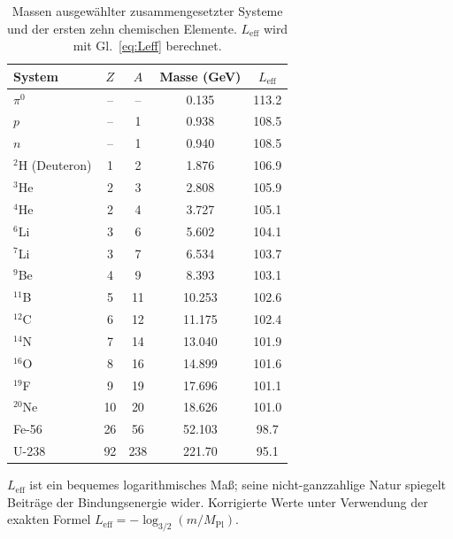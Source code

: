 \documentclass[11pt,a4paper]{article}
\begin{document}
	\begin{table}[H]
		\centering
		\caption{Massen ausgewählter zusammengesetzter Systeme und der ersten zehn chemischen Elemente. \(L_{\mathrm{eff}}\) wird mit Gl.~\eqref{eq:Leff} berechnet.}
		\label{tab:composite}
		\small
		\begin{tabular}{l c c c c}
			\toprule
			System & \(Z\) & \(A\) & Masse (GeV) & \(L_{\mathrm{eff}}\) \\
			\midrule
			\(\pi^0\) & – & – & 0.135 & 113.2 \\
			\(p\) & – & 1 & 0.938 & 108.5 \\
			\(n\) & – & 1 & 0.940 & 108.5 \\
			\(^2\)H (Deuteron) & 1 & 2 & 1.876 & 106.9 \\
			\(^3\)He & 2 & 3 & 2.808 & 105.9 \\
			\(^4\)He & 2 & 4 & 3.727 & 105.1 \\
			\(^6\)Li & 3 & 6 & 5.602 & 104.1 \\
			\(^7\)Li & 3 & 7 & 6.534 & 103.7 \\
			\(^9\)Be & 4 & 9 & 8.393 & 103.1 \\
			\(^{11}\)B & 5 & 11 & 10.253 & 102.6 \\
			\(^{12}\)C & 6 & 12 & 11.175 & 102.4 \\
			\(^{14}\)N & 7 & 14 & 13.040 & 101.9 \\
			\(^{16}\)O & 8 & 16 & 14.899 & 101.6 \\
			\(^{19}\)F & 9 & 19 & 17.696 & 101.1 \\
			\(^{20}\)Ne & 10 & 20 & 18.626 & 101.0 \\
			Fe-56 & 26 & 56 & 52.103 & 98.7 \\
			U-238 & 92 & 238 & 221.70 & 95.1 \\
			\bottomrule
		\end{tabular}
		\par\smallskip
		\footnotesize \(L_{\mathrm{eff}}\) ist ein bequemes logarithmisches Maß; seine nicht-ganzzahlige Natur spiegelt Beiträge der Bindungsenergie wider. Korrigierte Werte unter Verwendung der exakten Formel \(L_{\mathrm{eff}} = -\log_{3/2}(m/M_{\mathrm{Pl}})\).
	\end{table}
	
\end{document}

